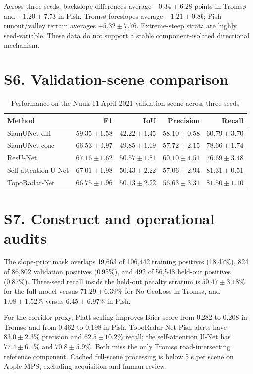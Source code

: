 \documentclass[11pt,a4paper]{article}
\begin{document}
Across three seeds, backslope differences average $-0.34\pm6.28$ points in Troms{\o} and $+1.20\pm7.73$ in Pish. Troms{\o} foreslopes average $-1.21\pm0.86$; Pish runout/valley terrain averages $+5.32\pm7.76$. Extreme-steep strata are highly seed-variable. These data do not support a stable component-isolated directional mechanism.

\section*{S6. Validation-scene comparison}

\begin{table}[h]
\caption{Performance on the Nuuk 11 April 2021 validation scene across three seeds}
\centering
\small
\begin{tabular}{lrrrr}
\toprule
Method & F1 & IoU & Precision & Recall \\
\midrule
SiamUNet-diff & $59.35\pm1.58$ & $42.22\pm1.45$ & $58.10\pm0.58$ & $60.79\pm3.70$ \\
SiamUNet-conc & $66.53\pm0.97$ & $49.85\pm1.09$ & $57.72\pm2.15$ & $78.66\pm1.74$ \\
ResU-Net & $67.16\pm1.62$ & $50.57\pm1.81$ & $60.10\pm4.51$ & $76.69\pm3.48$ \\
Self-attention U-Net & $67.01\pm1.98$ & $50.43\pm2.22$ & $57.06\pm2.94$ & $81.31\pm0.51$ \\
TopoRadar-Net & $66.75\pm1.96$ & $50.13\pm2.22$ & $56.63\pm3.31$ & $81.50\pm1.10$ \\
\bottomrule
\end{tabular}
\end{table}

\section*{S7. Construct and operational audits}

The slope-prior mask overlaps 19,663 of 106,442 training positives (18.47\%), 824 of 86,802 validation positives (0.95\%), and 492 of 56,548 held-out positives (0.87\%). Three-seed recall inside the held-out penalty stratum is $50.47\pm3.18\%$ for the full model versus $71.29\pm6.39\%$ for No-GeoLoss in Troms{\o}, and $1.08\pm1.52\%$ versus $6.45\pm6.97\%$ in Pish.

For the corridor proxy, Platt scaling improves Brier score from 0.282 to 0.208 in Troms{\o} and from 0.462 to 0.198 in Pish. TopoRadar-Net Pish alerts have $83.0\pm2.3\%$ precision and $62.5\pm10.2\%$ recall; the self-attention U-Net has $77.4\pm6.1\%$ and $70.8\pm5.9\%$. Both miss the only Troms{\o} road-intersecting reference component. Cached full-scene processing is below 5 s per scene on Apple MPS, excluding acquisition and human review.
\end{document}

